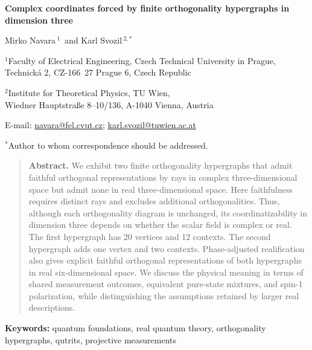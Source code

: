 \documentclass[12pt,a4paper]{article}
\theoremstyle{definition}
\theoremstyle{remark}
\begin{document}
\begin{center}
{\LARGE\bfseries Complex coordinates forced by finite orthogonality hypergraphs in dimension three\par}
\vspace{1.2em}
{\large Mirko Navara\,$^{1}$\,
and Karl Svozil\,$^{2,*}$\,\par}
\vspace{0.8em}
$^1$Faculty of Electrical Engineering, Czech Technical University in Prague,\\
Technick\'{a} 2, CZ-166~27 Prague 6, Czech Republic\par
\vspace{0.5em}
$^2$Institute for Theoretical Physics, TU Wien,\\
Wiedner Hauptstra{\ss}e 8--10/136, A-1040 Vienna, Austria\par
\vspace{0.6em}
E-mail: \href{mailto:navara@fel.cvut.cz}{navara@fel.cvut.cz};
\href{mailto:karl.svozil@tuwien.ac.at}{karl.svozil@tuwien.ac.at}\par
\vspace{0.25em}
$^*$Author to whom correspondence should be addressed.
\end{center}
\vspace{0.6em}

\begin{quote}
\noindent\textbf{Abstract.}
We exhibit two finite orthogonality hypergraphs that admit faithful orthogonal representations by rays in complex three-dimensional space but admit none in real three-dimensional space. Here faithfulness requires distinct rays and excludes additional orthogonalities. Thus, although each orthogonality diagram is unchanged, its coordinatizability in dimension three depends on whether the scalar field is complex or real. The first hypergraph has 20 vertices and 12 contexts. The second hypergraph adds one vertex and two contexts. Phase-adjusted realification also gives explicit faithful orthogonal representations of both hypergraphs in real six-dimensional space. We discuss the physical meaning in terms of shared measurement outcomes, equivalent pure-state mixtures, and spin-1 polarization, while distinguishing the assumptions retained by larger real descriptions.
\end{quote}
\noindent\textbf{Keywords:} quantum foundations, real quantum theory,
orthogonality hypergraphs, qutrits, projective measurements
\vspace{0.5em}
\end{document}
